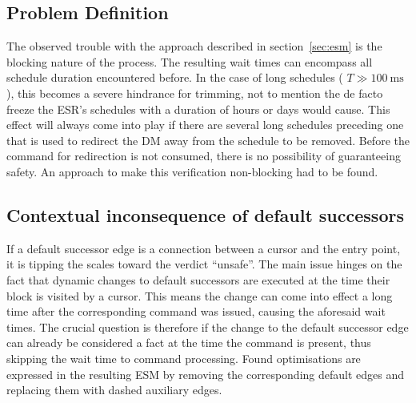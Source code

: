 \subsection{Problem Definition}
The observed trouble with the approach described in section~\ref{sec:esm} is the blocking nature of the process. The resulting wait times can encompass all schedule duration encountered before. In the case of long schedules ( $T \gg \SI{100}{\milli\second}$ ), this becomes a severe hindrance for trimming, not to mention the de facto freeze the ESR's schedules with a duration of hours or days would cause.
This effect will always come into play if there are several long schedules preceding one that is used to redirect the DM away from the schedule to be removed. Before the command for redirection is not consumed, there is no possibility of guaranteeing safety. An approach to make this verification non-blocking had to be found.

\subsection{Contextual inconsequence of default successors}
If a default successor edge is a connection between a cursor and the entry point, it is tipping the scales toward the verdict \enquote{unsafe}.
The main issue hinges on the fact that dynamic changes to default successors are executed at the time their block is visited by a cursor. This means the change can come into effect a long time after the corresponding command was issued, causing the aforesaid wait times. The crucial question is therefore if the change to the default successor edge can already be considered a fact at the time the command is present, thus skipping the wait time to command processing. Found optimisations are expressed in the resulting ESM by removing the corresponding default edges and replacing them with dashed auxiliary edges.

